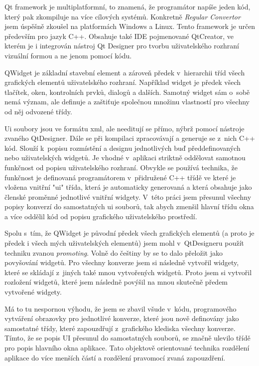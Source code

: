 
Qt framework je multiplatformní, to znamená, že programátor napíše jeden kód, který pak zkompiluje na více cílových systémů. Konkretně \textit{Regular Convertor} jsem úspěšně zkoušel na platformách Windows a Linux. Tento framework je určen především pro jazyk C++. Obsahuje také IDE pojmenované QtCreator, ve kterém je i integrován nástroj Qt Designer pro tvorbu uživatelského rozhraní vizuální formou a ne jenom pomocí kódu. \cite{QT} 


QWidget je základní stavební element a zároveň předek v~hierarchii tříd všech grafických elementů uživatelského rozhraní. Například widget je předek všech tlačítek, oken, kontrolních prvků, dialogů a dalších. Samotný widget sám o~sobě nemá význam, ale definuje a zaštiťuje společnou množinu vlastností pro všechny od něj odvozené třídy.


Ui soubory jsou ve formátu xml, ale needitují se přímo, nýbrž pomocí nástroje zvaného QtDesigner. Dále se při kompilaci zpracovávají a generuje se z~nich C++ kód. Slouží k~popisu rozmístění a designu jednotlivých buď předdefinovaných nebo uživatelských widgetů. Je vhodné v~aplikaci striktně oddělovat samotnou funkčnost od popisu uživatelského rozhraní. Obvykle se používá technika, že funkčnost je definovaná programátorem v~přidružené C++ třídě ve které je vložena vnitřní "ui" třída, která je automaticky generovaná a která obsahuje jako členské proměnné jednotlivé vnitřní widgety. V~této práci jsem přesunul všechny popisy konverzí do samostatných ui souborů, tak abych zmenšil hlavní třídu okna a více oddělil kód od popisu grafického uživatelského prostředí. 


Spolu s~tím, že QWidget je původní předek všech grafických elementů (a proto je předek i všech mých uživatelských elementů) jsem mohl v~QtDesigneru použít techniku zvanou \textit{promoting}. Volně do češtiny by se to dalo přeložit jako povyšování widgetů. Pro všechny konverze jsem si následně vytvořil widgety, které se skládají z~jiných také mnou vytvořených widgetů. Proto jsem si vytvořil rozložení widgetů, které jsem následně povýšil na mnou skutečně předem vytvořené widgety.

Má to tu nespornou výhodu, že jsem se zbavil všude v~kódu, programového vytváření obrazovky pro jednotlivé konverze, které jsou nově definovány jako samostatné třídy, které zapouzdřují z~grafického klediska všechny konverze. Tímto, že se popis UI přesunul do samostatných souborů, se značně ulevilo třídě pro popis hlavního okna aplikace. Tato objektově orientované technika rozdělení aplikace do více menších částí a rozdělení pravomocí zvaná zapouzdření.

